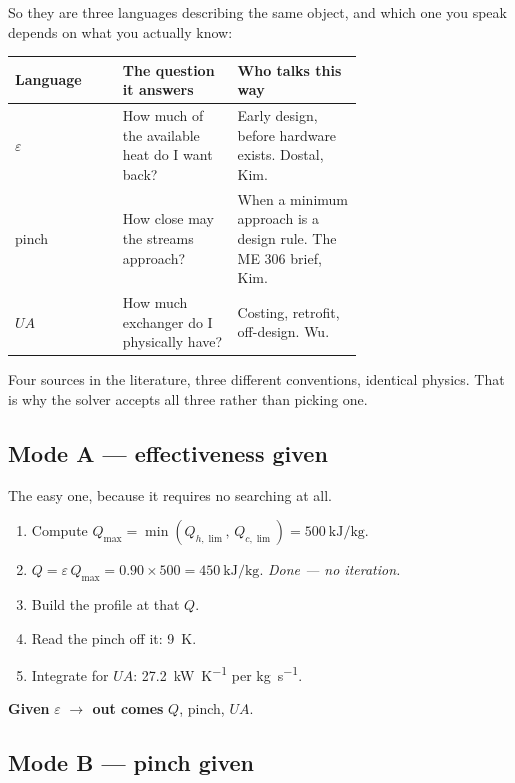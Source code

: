 \documentclass[11pt,a4paper]{report}
\begin{document}
So they are three languages describing the same object, and which one you
speak depends on what you actually know:

\begin{center}
\begin{tabular}{@{}lp{0.33\linewidth}p{0.36\linewidth}@{}}
\toprule
Language & The question it answers & Who talks this way \\
\midrule
$\varepsilon$ & How much of the available heat do I want back?
  & Early design, before hardware exists. Dostal, Kim. \\
pinch & How close may the streams approach?
  & When a minimum approach is a design rule. The ME 306 brief, Kim. \\
$UA$ & How much exchanger do I physically have?
  & Costing, retrofit, off-design. Wu. \\
\bottomrule
\end{tabular}
\end{center}

Four sources in the literature, three different conventions, identical
physics. That is why the solver accepts all three rather than picking one.

\subsection{Mode A --- effectiveness given}

The easy one, because it requires no searching at all.

\begin{enumerate}\itemsep2pt
\item Compute $Q_{\max} = \min(Q_{h,\lim},\, Q_{c,\lim}) =
      \SI{500}{\kilo\joule\per\kilogram}$.
\item $Q = \varepsilon\, Q_{\max} = 0.90 \times 500 =
      \SI{450}{\kilo\joule\per\kilogram}$. \emph{Done --- no iteration.}
\item Build the profile at that $Q$.
\item Read the pinch off it: \SI{9}{\kelvin}.
\item Integrate for $UA$: \SI{27.2}{\kilo\watt\per\kelvin} per
      \si{\kilogram\per\second}.
\end{enumerate}

\noindent \textbf{Given} $\varepsilon$ \quad\textbf{$\to$ out comes}
$Q$, pinch, $UA$.

\subsection{Mode B --- pinch given}
\end{document}
